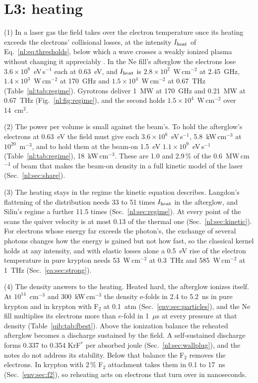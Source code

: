\section{L3: heating}
\label{p1:sec:L3}

{\noindent}(1) In a laser gas the field takes over the electron temperature once its
heating exceeds the electrons' collisional losses, at the intensity $I_{\rm heat}$ of
Eq.~\eqref{nl:eq:thresholds}, below which a wave crosses a weakly ionized plasma
without changing it appreciably \cite{p1:GinzburgGurevich1960}. In the Ne fill's
afterglow the electrons lose $3.6\times10^{8}$~eV\,s$^{-1}$ each at 0.63~eV, and
$I_{\rm heat}$ is $2.8\times10^{2}$~W\,cm$^{-2}$ at 2.45~GHz,
$1.4\times10^{3}$~W\,cm$^{-2}$ at 170~GHz and $1.5\times10^{4}$~W\,cm$^{-2}$ at
0.67~THz (Table~\ref{nl:tab:regime}). Gyrotrons deliver 1~MW at 170~GHz
\cite{p1:Sakamoto2007} and 0.21~MW at 0.67~THz \cite{p1:Glyavin2012}
(Fig.~\ref{nl:fig:regime}), and the second holds $1.5\times10^{4}$~W\,cm$^{-2}$ over
14~cm$^2$.

{\noindent}(2) The power per volume is small against the beam's. To hold the
afterglow's electrons at 0.63~eV the field must give each $3.6\times10^{8}$~eV\,s$^{-1}$,
5.8~kW\,cm$^{-3}$ at $10^{20}$~m$^{-3}$, and to hold them at the beam-on 1.5~eV
$1.1\times10^{9}$~eV\,s$^{-1}$ (Table~\ref{nl:tab:regime}), 18~kW\,cm$^{-3}$. These are
1.0 and 2.9\,\% of the 0.6~MW\,cm$^{-3}$ of beam that makes the beam-on density in a
full kinetic model of the laser (Sec.~\ref{nl:sec:share}).

{\noindent}(3) The heating stays in the regime the kinetic equation describes.
Langdon's flattening of the distribution needs 33 to 51 times $I_{\rm heat}$ in the
afterglow, and Silin's regime a further 11.5 times (Sec.~\ref{nl:sec:regime}). At every
point of the scans the quiver velocity is at most 0.13 of the thermal one
(Sec.~\ref{nl:sec:kinetic}). For electrons whose energy far exceeds the photon's, the
exchange of several photons changes how the energy is gained but not how fast, so the
classical kernel holds at any intensity, and with elastic losses alone a 0.5~eV rise of
the electron temperature in pure krypton needs 53~W\,cm$^{-2}$ at 0.3~THz and
585~W\,cm$^{-2}$ at 1~THz (Sec.~\ref{ea:sec:strong}).

{\noindent}(4) The density answers to the heating. Heated hard, the afterglow ionizes
itself. At $10^{14}$~cm$^{-3}$ and 300~kW\,cm$^{-3}$ the density e-folds in 2.4 to
5.2~ns in pure krypton and in krypton with F$_2$ at 0.1~atm
(Sec.~\ref{env:sec:particles}), and the Ne fill multiplies its electrons more than
$e$-fold in 1~$\mu$s at every pressure at that density (Table~\ref{qib:tab:fbest}).
Above the ionization balance the reheated afterglow becomes a discharge sustained by
the field. A self-sustained discharge forms 0.337 to 0.354 KrF$^*$ per absorbed joule
(Sec.~\ref{nl:sec:wallplug}), and the notes do not address its stability. Below that
balance the F$_2$ removes the electrons. In krypton with 2\,\% F$_2$ attachment takes
them in 0.1 to 17~ns (Sec.~\ref{env:sec:f2}), so reheating acts on electrons that turn
over in nanoseconds.

